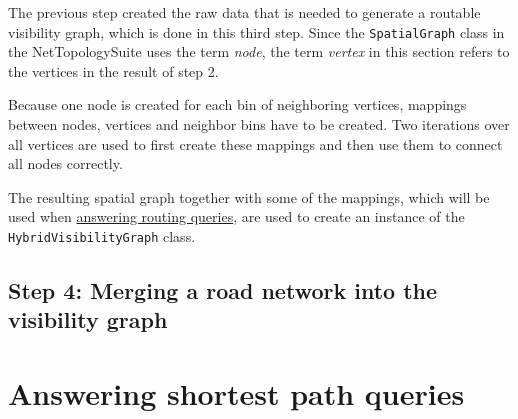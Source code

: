 		The previous step created the raw data that is needed to generate a routable visibility graph, which is done in this third step.
		Since the \texttt{SpatialGraph} class in the NetTopologySuite uses the term \emph{node}, the term \emph{vertex} in this section refers to the vertices in the result of step 2.
		
		Because one node is created for each bin of neighboring vertices, mappings between nodes, vertices and neighbor bins have to be created.
		Two iterations over all vertices are used to first create these mappings and then use them to connect all nodes correctly.
		
		
		The resulting spatial graph together with some of the mappings, which will be used when \hyperref[sec:answering-queries]{answering routing queries}, are used to create an instance of the \texttt{HybridVisibilityGraph} class.
		
	\subsection{Step 4: Merging a road network into the visibility graph}

\section{Answering shortest path queries}
\label{sec:answering-queries}